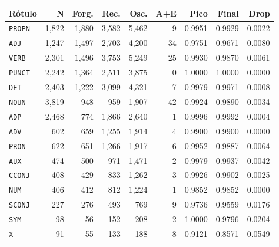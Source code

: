 \begin{table}[ht]
\begin{minipage}[t]{0.54\linewidth}
\end{minipage}
\hfill
\begin{minipage}[t]{0.42\linewidth}
\centering\tiny
\begin{tabular}{lrrrrrrrr}
\toprule
\textbf{Rótulo} & \textbf{N} & \textbf{Forg.} & \textbf{Rec.} & \textbf{Osc.} & \textbf{A+E} & \textbf{Pico} & \textbf{Final} & \textbf{Drop} \\
\midrule
\texttt{PROPN} & 1,822 & 1,880 & 3,582 & 5,462 & 9 & 0.9951 & 0.9929 & 0.0022 \\
\texttt{ADJ} & 1,247 & 1,497 & 2,703 & 4,200 & 34 & 0.9751 & 0.9671 & 0.0080 \\
\texttt{VERB} & 2,301 & 1,496 & 3,753 & 5,249 & 25 & 0.9930 & 0.9870 & 0.0061 \\
\texttt{PUNCT} & 2,242 & 1,364 & 2,511 & 3,875 & 0 & 1.0000 & 1.0000 & 0.0000 \\
\texttt{DET} & 2,403 & 1,222 & 3,099 & 4,321 & 7 & 0.9979 & 0.9971 & 0.0008 \\
\texttt{NOUN} & 3,819 & 948 & 959 & 1,907 & 42 & 0.9924 & 0.9890 & 0.0034 \\
\texttt{ADP} & 2,468 & 774 & 1,866 & 2,640 & 1 & 0.9996 & 0.9992 & 0.0004 \\
\texttt{ADV} & 602 & 659 & 1,255 & 1,914 & 4 & 0.9900 & 0.9900 & 0.0000 \\
\texttt{PRON} & 622 & 651 & 1,266 & 1,917 & 6 & 0.9952 & 0.9887 & 0.0064 \\
\texttt{AUX} & 474 & 500 & 971 & 1,471 & 2 & 0.9979 & 0.9937 & 0.0042 \\
\texttt{CCONJ} & 408 & 429 & 833 & 1,262 & 3 & 0.9926 & 0.9902 & 0.0025 \\
\texttt{NUM} & 406 & 412 & 812 & 1,224 & 1 & 0.9852 & 0.9852 & 0.0000 \\
\texttt{SCONJ} & 227 & 276 & 493 & 769 & 9 & 0.9736 & 0.9559 & 0.0176 \\
\texttt{SYM} & 98 & 56 & 152 & 208 & 2 & 1.0000 & 0.9796 & 0.0204 \\
\texttt{X} & 91 & 55 & 133 & 188 & 8 & 0.9121 & 0.8571 & 0.0549 \\
\bottomrule
\end{tabular}
\end{minipage}
\end{table}


